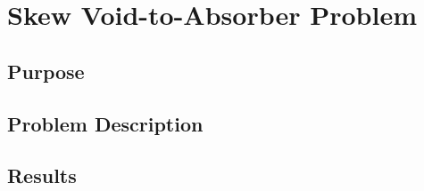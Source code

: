 \section{Skew Void-to-Absorber Problem}

\subsection{Purpose}

\subsection{Problem Description}

\subsection{Results}
